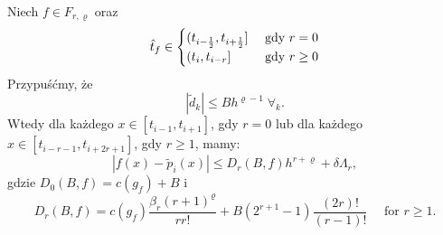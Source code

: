 \documentclass[oik, pdftex, robocza, man]{mgrwms}
\begin{document}
    \begin{lemma} \label{lem:algMP_3}
        Niech $f \in F_{r, \varrho}$ oraz 
        \begin{equation*}
            \hat{t}_{f} \in \begin{cases}
                (t_{i-\frac{1}{2}}, t_{i + \frac{1}{2}}]    &\text{ gdy } r=0 \\
                (t_{i}, t_{i - r}]                          &\text{ gdy } r \geq 0 \\
            \end{cases}
        \end{equation*}
        Przypuśćmy, że 
        \begin{equation} \label{eq:2}
            |\tilde{d}_{k}| \leq Bh^{\varrho-1} \; \forall_{k}.
        \end{equation}
        Wtedy dla każdego $x \in [t_{i-1}, t_{i+1}]$, gdy $r=0$ lub dla każdego $x \in [t_{i-r-1}, t_{i+2r+1}]$, gdy $r \geq 1$, mamy:
        \begin{equation*}
            |f(x) - \tilde{p}_{i}(x)| \leq D_{r}(B, f)h^{r+\varrho} + \delta\Lambda_{r},
        \end{equation*}
        gdzie $D_{0}(B,f) = c(g_{f}) + B$ i
        \begin{equation*}
            D_{r}(B, f)=c\left(g_{f}\right) \frac{\beta_{r}(r+1)^{\varrho}}{r r !}+B\left(2^{r+1}-1\right) \frac{(2 r) !}{(r-1) !} \quad \text { for } r \geq 1 .
        \end{equation*}
    \end{lemma}
\end{document}
